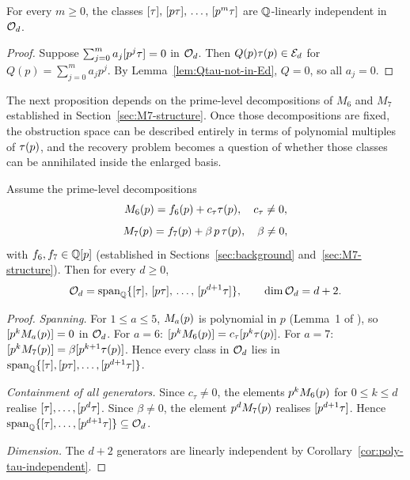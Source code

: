 \documentclass[11pt]{article}
\begin{document}
\begin{corollary}
\label{cor:poly-tau-independent}
For every $m\ge 0$, the classes $[\tau],\,[p\tau],\,\dots,\,[p^m\tau]$ are
$\mathbb{Q}$-linearly independent in $\mathcal{O}_d$.
\end{corollary}

\begin{proof}
Suppose $\sum_{j=0}^m a_j [p^j\tau]=0$ in $\mathcal{O}_d$.
Then $Q(p)\tau(p)\in\mathcal{E}_d$ for $Q(p)=\sum_{j=0}^m a_j p^j$.
By Lemma~\ref{lem:Qtau-not-in-Ed}, $Q=0$, so all $a_j=0$.
\end{proof}

The next proposition depends on the prime-level decompositions of $M_6$ and $M_7$
established in Section~\ref{sec:M7-structure}.
Once those decompositions are fixed, the obstruction space can be described entirely in
terms of polynomial multiples of $\tau(p)$, and the recovery problem becomes a question
of whether those classes can be annihilated inside the enlarged basis.

\begin{proposition}
\label{prop:Od-full-structure}
Assume the prime-level decompositions
\[
  M_{6}(p)=f_6(p)+c_\tau\tau(p),\quad c_\tau\ne 0,
\]
\[
  M_{7}(p)=f_7(p)+\beta\,p\,\tau(p),\quad \beta\ne 0,
\]
with $f_6,f_7\in\mathbb{Q}[p]$ (established in Sections~\ref{sec:background} and~\ref{sec:M7-structure}).
Then for every $d\ge 0$,
\[
  \mathcal{O}_d = \operatorname{span}_{\mathbb{Q}}\{[\tau],\,[p\tau],\,\dots,\,[p^{d+1}\tau]\},
  \qquad \dim\mathcal{O}_d = d+2.
\]
\end{proposition}

\begin{proof}
\textit{Spanning.}
For $1\le a\le 5$, $M_{a}(p)$ is polynomial in $p$ (Lemma~1 of \cite{Randsley2025a}),
so $[p^kM_{a}(p)]=0$ in $\mathcal{O}_d$.
For $a=6$: $[p^kM_{6}(p)]=c_\tau[p^k\tau(p)]$.
For $a=7$: $[p^kM_{7}(p)]=\beta[p^{k+1}\tau(p)]$.
Hence every class in $\mathcal{O}_d$ lies in
$\operatorname{span}_{\mathbb{Q}}\{[\tau],[p\tau],\dots,[p^{d+1}\tau]\}$.

\textit{Containment of all generators.}
Since $c_\tau\ne 0$, the elements $p^kM_{6}(p)$ for $0\le k\le d$ realise
$[\tau],\dots,[p^d\tau]$.
Since $\beta\ne 0$, the element $p^dM_{7}(p)$ realises $[p^{d+1}\tau]$.
Hence $\operatorname{span}_{\mathbb{Q}}\{[\tau],\dots,[p^{d+1}\tau]\}\subseteq\mathcal{O}_d$.

\textit{Dimension.}
The $d+2$ generators are linearly independent by Corollary~\ref{cor:poly-tau-independent}.
\end{proof}
\end{document}
